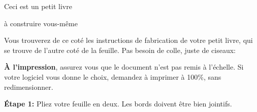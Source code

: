 \documentclass[a4paper,12pt]{article}
\begin{document}
\begin{center}
  {\Huge Ceci est un petit livre}

  {\Large à construire vous-même}
\end{center}

\large

Vous trouverez de ce coté les instructions de fabrication de votre
petit livre, qui se trouve de l'autre coté de la feuille.  Pas besoin
de colle, juste de ciseaux: 

\bigskip\bigskip

\noindent\textbf{À l'impression}, assurez vous que le document n'est
pas remis à l'échelle. Si votre logiciel vous donne le choix, demandez
à imprimer à 100\%, sans redimensionner.

\medskip
\noindent\textbf{Étape 1:} Pliez votre feuille en deux.
Les bords doivent être bien jointifs.
\end{document}
